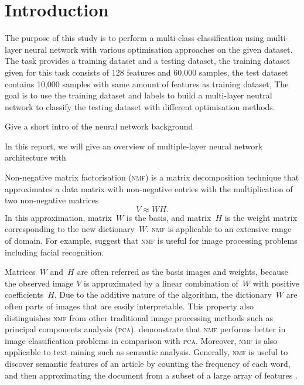 \section{Introduction\label{chapter1}}
The purpose of this study is to perform a multi-class classification using multi-layer neural network with various optimisation approaches on the given dataset.
The task provides a training dataset and a testing dataset,
the training dataset given for this task consists of 128 features and 60,000 samples,
the test dataset contains 10,000 samples with same amount of features as training dataset,
The goal is to use the training dataset and labels to build a multi-layer neutral network to classify the testing dataset with different optimisation methods.

Give a short intro of the neural network background

In this report, we will give an overview of multiple-layer neural network architecture with 

Non-negative matrix factorisation (\textsc{nmf}) is a matrix decomposition technique that approximates a data matrix with non-negative entries with the multiplication of two non-negative matrices
\begin{equation*}
  V \approx WH.
\end{equation*}
In this approximation, matrix~$W$ is the basis, and matrix~$H$ is the weight matrix corresponding to the new dictionary~$W$. \textsc{nmf}
is applicable to an extensive range of domain. For example, \citet{lee1999learning} suggest that \textsc{nmf} is useful for image processing problems including facial recognition.

Matrices~$W$ and~$H$ are often referred as the basis images and weights, 
because the observed image $V$ is approximated by a linear combination of~$W$ with positive coefficients~$H$.
Due to the additive nature of the algorithm, the dictionary~$W$ are often parts of images that are easily interpretable.
This property also distinguishes \textsc{nmf} from other traditional image processing methods such as principal components analysis (\textsc{pca}).
\citet{guillamet2002non} demonstrate that \textsc{nmf} performs better in image classification problems in comparison with \textsc{pca}.
Moreover, \textsc{nmf} is also applicable to text mining such as semantic analysis.
Generally, \textsc{nmf} is useful to discover semantic features of an article by counting the frequency of each word, and then approximating the document from a subset of a large array of features \citep{lee1999learning}.

